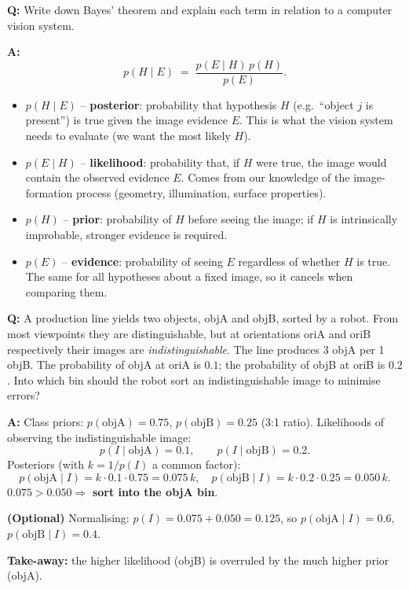 \begin{exbox}
\textbf{Q:} Write down Bayes' theorem and explain each term in relation to a computer vision system.

\textbf{A:}
\[
p(H \mid E) \;=\; \frac{p(E \mid H)\, p(H)}{p(E)}.
\]
\begin{itemize}
  \item $p(H \mid E)$ -- \textbf{posterior}: probability that hypothesis $H$ (e.g.\ ``object $j$ is present'') is true given the image evidence $E$. This is what the vision system needs to evaluate (we want the most likely $H$).
  \item $p(E \mid H)$ -- \textbf{likelihood}: probability that, if $H$ were true, the image would contain the observed evidence $E$. Comes from our knowledge of the image-formation process (geometry, illumination, surface properties).
  \item $p(H)$ -- \textbf{prior}: probability of $H$ before seeing the image; if $H$ is intrinsically improbable, stronger evidence is required.
  \item $p(E)$ -- \textbf{evidence}: probability of seeing $E$ regardless of whether $H$ is true. The same for all hypotheses about a fixed image, so it cancels when comparing them.
\end{itemize}
\end{exbox}

\begin{exbox}
\textbf{Q:} A production line yields two objects, objA and objB, sorted by a robot. From most viewpoints they are distinguishable, but at orientations oriA and oriB respectively their images are \emph{indistinguishable}. The line produces 3 objA per 1 objB. The probability of objA at oriA is $0.1$; the probability of objB at oriB is $0.2$. Into which bin should the robot sort an indistinguishable image to minimise errors?

\textbf{A:} Class priors: $p(\text{objA}) = 0.75$, $p(\text{objB}) = 0.25$ (3:1 ratio). Likelihoods of observing the indistinguishable image:
\[
p(I\mid\text{objA}) = 0.1, \qquad p(I\mid\text{objB}) = 0.2.
\]
Posteriors (with $k = 1/p(I)$ a common factor):
\[
p(\text{objA}\mid I) = k \cdot 0.1 \cdot 0.75 = 0.075\,k, \quad
p(\text{objB}\mid I) = k \cdot 0.2 \cdot 0.25 = 0.050\,k.
\]
$0.075 > 0.050 \Rightarrow$ \textbf{sort into the objA bin}.

\textbf{(Optional)} Normalising: $p(I) = 0.075 + 0.050 = 0.125$, so $p(\text{objA}\mid I) = 0.6$, $p(\text{objB}\mid I) = 0.4$.

\textbf{Take-away:} the higher likelihood (objB) is overruled by the much higher prior (objA).
\end{exbox}

